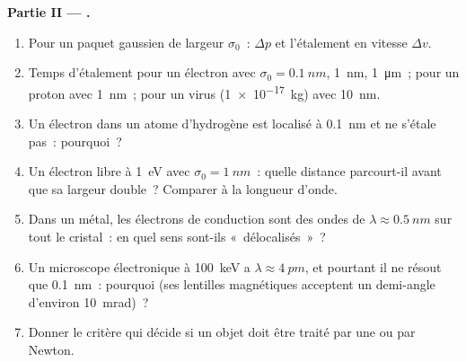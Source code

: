 \begin{problem}
\textbf{Partie II --- .}
\begin{enumerate}[resume]
  \item Pour un paquet gaussien de largeur $\sigma_0$~: $\Delta p$ et
        l'étalement en vitesse $\Delta v$.
  \item Temps d'étalement pour un électron avec $\sigma_0 = \qty{0.1}{nm}$,
        \qty{1}{nm}, \qty{1}{\micro m}~; pour un proton avec \qty{1}{nm}~; pour un
        virus (\qty{1e-17}{kg}) avec \qty{10}{nm}.
  \item Un électron dans un atome d'hydrogène est localisé à \qty{0.1}{nm}
        et ne s'étale pas~: pourquoi~?
  \item Un électron libre à \qty{1}{eV} avec $\sigma_0 = \qty{1}{nm}$~: quelle distance
        parcourt-il avant que sa largeur double~? Comparer à la
        longueur d'onde.
  \item Dans un métal, les électrons de conduction sont des ondes de $\lambda \approx
        \qty{0.5}{nm}$ sur tout le cristal~: en quel sens sont-ils
        «~délocalisés~»~?
  \item Un microscope électronique à \qty{100}{keV} a $\lambda \approx
        \qty{4}{pm}$, et pourtant il ne résout que \qty{0.1}{nm}~: pourquoi (ses lentilles
        magnétiques acceptent un demi-angle d'environ \qty{10}{mrad})~?
  \item Donner le critère qui décide si un objet doit être
        traité par une  ou par Newton.
\end{enumerate}


\end{problem}
